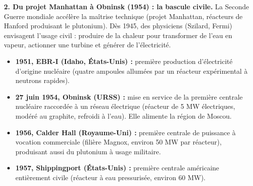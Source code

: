 \documentclass[11pt]{article}
\newcommand{\cle}[1]{{\popxbold\color{popdark}#1}}
\begin{document}
\textbf{2. Du projet Manhattan à Obninsk (1954) : la bascule civile.}
La Seconde Guerre mondiale accélère la maîtrise technique (projet Manhattan, réacteurs de Hanford produisant le plutonium). Dès 1945, des physiciens (Szilard, Fermi) envisagent l'usage civil : produire de la chaleur pour transformer de l'eau en vapeur, actionner une turbine et générer de l'électricité.
\begin{itemize}
    \item \textbf{1951, EBR-I (Idaho, États-Unis) :} première production d'électricité d'origine nucléaire (quatre ampoules allumées par un réacteur expérimental à neutrons rapides).
    \item \textbf{27 juin 1954, Obninsk (URSS) :} mise en service de la \cle{première centrale nucléaire raccordée à un réseau électrique} (réacteur de 5 MW électriques, modéré au graphite, refroidi à l'eau). Elle alimente la région de Moscou.
    \item \textbf{1956, Calder Hall (Royaume-Uni) :} première centrale de puissance à vocation commerciale (filière Magnox, environ 50 MW par réacteur), produisant aussi du plutonium à usage militaire.
    \item \textbf{1957, Shippingport (États-Unis) :} première centrale américaine entièrement civile (réacteur à eau pressurisée, environ 60 MW).
\end{itemize}
\end{document}
